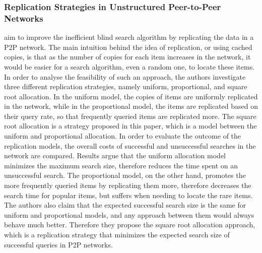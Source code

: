 \subsubsection{Replication Strategies in Unstructured Peer-to-Peer Networks}
\cite{Cohen02} aim to improve the inefficient blind search algorithm by
replicating the data in a P2P network. The main intuition behind the
idea of replication, or using cached copies, is that as the number of copies for
each item increases in the network, it would be easier for a search algorithm,
even a random one, to locate these items. In order to analyse the feasibility of
such an approach, the authors investigate three different replication
strategies, namely uniform, proportional, and square root allocation. In the
uniform model, the copies of items are uniformly replicated in the network,
while in the proportional model, the items are replicated based on their query
rate, so that frequently queried items are replicated more. The square root
allocation is a strategy proposed in this paper, which is a model between the
uniform and proportional allocation.  In order to evaluate the outcome of the
replication models, the overall costs of successful and unsuccessful searches in
the network are compared. Results argue that the uniform allocation model
minimizes the maximum search size, therefore reduces the time spent on an
unsuccessful search. The proportional model, on the other hand, promotes the
more frequently queried items by replicating them more, therefore decreases the
search time for popular items, but suffers when needing to locate the rare
items. The authors also claim that the expected successful search size is the
same for uniform and proportional models, and any approach between them would
always behave much better. Therefore they propose the square root allocation
approach, which is a replication strategy that minimizes the expected search
size of successful queries in P2P networks.

